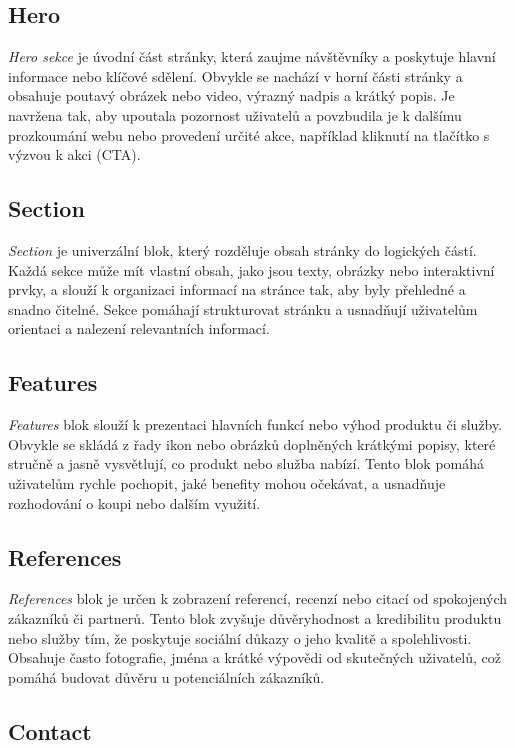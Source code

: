 \subsection{Hero}

\emph{Hero sekce} je úvodní část stránky, která zaujme návštěvníky a poskytuje hlavní informace nebo klíčové sdělení. Obvykle se nachází v horní části stránky a obsahuje poutavý obrázek nebo video, výrazný nadpis a krátký popis. Je navržena tak, aby upoutala pozornost uživatelů a povzbudila je k dalšímu prozkoumání webu nebo provedení určité akce, například kliknutí na tlačítko s výzvou k akci (CTA).

\subsection{Section}

\emph{Section} je univerzální blok, který rozděluje obsah stránky do logických částí. Každá sekce může mít vlastní obsah, jako jsou texty, obrázky nebo interaktivní prvky, a slouží k organizaci informací na stránce tak, aby byly přehledné a snadno čitelné. Sekce pomáhají strukturovat stránku a usnadňují uživatelům orientaci a nalezení relevantních informací.

\subsection{Features}

\emph{Features} blok slouží k prezentaci hlavních funkcí nebo výhod produktu či služby. Obvykle se skládá z řady ikon nebo obrázků doplněných krátkými popisy, které stručně a jasně vysvětlují, co produkt nebo služba nabízí. Tento blok pomáhá uživatelům rychle pochopit, jaké benefity mohou očekávat, a usnadňuje rozhodování o koupi nebo dalším využití.

\subsection{References}

\emph{References} blok je určen k zobrazení referencí, recenzí nebo citací od spokojených zákazníků či partnerů. Tento blok zvyšuje důvěryhodnost a kredibilitu produktu nebo služby tím, že poskytuje sociální důkazy o jeho kvalitě a spolehlivosti. Obsahuje často fotografie, jména a krátké výpovědi od skutečných uživatelů, což pomáhá budovat důvěru u potenciálních zákazníků.

\subsection{Contact}


